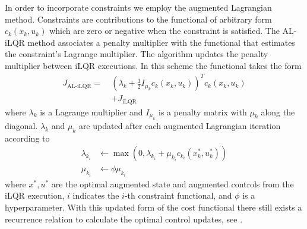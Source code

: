 \documentclass[
  amsfonts,
  amsmath,
  tbtags,
  amssymb,
  aps,
  nobibnotes,
  twocolumn,
]{revtex4-2}
\begin{document}
In order to incorporate constraints we employ
the augmented Lagrangian method. Constraints are contributions
to the functional of arbitrary form $c_{k}(x_{k}, u_{k})$ which are
zero or negative when the constraint is satisfied. The AL-iLQR
method associates a penalty multiplier with the functional
that estimates the constraint's Lagrange multiplier.
The algorithm updates the penalty multiplier between
iLQR executions. In this scheme the functional takes the form
\begin{equation}
  \begin{aligned}
    J_{\textrm{AL-iLQR}} = \ &(\lambda_{k} + \frac{1}{2}I_{\mu_{k}} c_{k}(x_{k}, u_{k}))^{T} c_{k}(x_{k}, u_{k})\\
    &+ J_{\textrm{iLQR}}
  \end{aligned}
\end{equation}
where $\lambda_{k}$ is a Lagrange multiplier and $I_{\mu_{k}}$ is a penalty matrix
with $\mu_{k}$ along the diagonal.
$\lambda_{k}$ and $\mu_{k}$ are updated after each augmented Lagrangian iteration according to
\begin{align}
  \lambda_{k_{i}} &\gets \max(0, \lambda_{k_{i}} + \mu_{k_{i}} c_{k_{i}}(x_{k}^{*}, u_{k}^{*}))\\
  \mu_{k_{i}} &\gets \phi \mu_{k_{i}}
\end{align}
where $x^{*}, u^{*}$ are the optimal augmented state and augmented controls from the iLQR execution,
$i$ indicates the $i$-th constraint functional,
and $\phi$ is a hyperparameter. With this updated form of the cost
functional there still exists a recurrence relation to calculate the optimal control
updates, see \cite{howell2019altro}.
\end{document}
